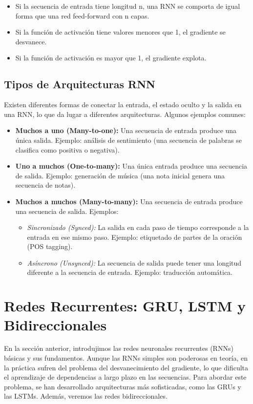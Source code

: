\documentclass{article}
\begin{document}
\begin{itemize}
\item Si la secuencia de entrada tiene longitud n, una RNN se comporta de igual forma que una red feed-forward con n capas.
\item Si la función de activación tiene valores menores que 1, el gradiente se desvanece.
\item Si la función de activación es mayor que 1, el gradiente explota.
\end{itemize}

\subsection{Tipos de Arquitecturas RNN}

Existen diferentes formas de conectar la entrada, el estado oculto y la salida en una RNN, lo que da lugar a diferentes arquitecturas.  Algunos ejemplos comunes:

\begin{itemize}
    \item \textbf{Muchos a uno (Many-to-one):}  Una secuencia de entrada produce una única salida.  Ejemplo: análisis de sentimiento (una secuencia de palabras se clasifica como positiva o negativa).
    \item \textbf{Uno a muchos (One-to-many):}  Una única entrada produce una secuencia de salida.  Ejemplo: generación de música (una nota inicial genera una secuencia de notas).
    \item \textbf{Muchos a muchos (Many-to-many):}  Una secuencia de entrada produce una secuencia de salida.  Ejemplos:
        \begin{itemize}
            \item \textit{Sincronizado (Synced):}  La salida en cada paso de tiempo corresponde a la entrada en ese mismo paso.  Ejemplo: etiquetado de partes de la oración (POS tagging).
            \item \textit{Asíncrono (Unsynced):}  La secuencia de salida puede tener una longitud diferente a la secuencia de entrada.  Ejemplo: traducción automática.
        \end{itemize}
\end{itemize}

\section{Redes Recurrentes: GRU, LSTM y Bidireccionales}

En la sección anterior, introdujimos las redes neuronales recurrentes (RNNs) básicas y sus fundamentos.  Aunque las RNNs simples son poderosas en teoría, en la práctica sufren del problema del desvanecimiento del gradiente, lo que dificulta el aprendizaje de dependencias a largo plazo en las secuencias.  Para abordar este problema, se han desarrollado arquitecturas más sofisticadas, como las GRUs y las LSTMs. Además, veremos las redes bidireccionales.
\end{document}
